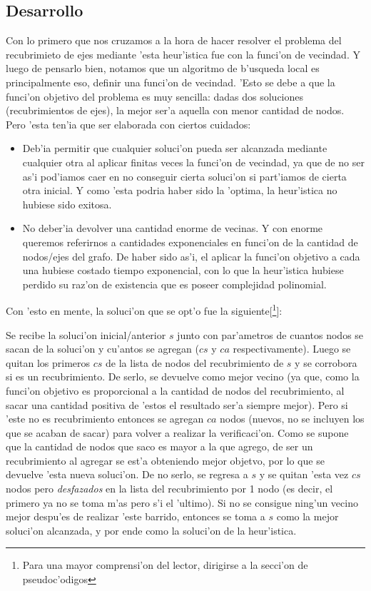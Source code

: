 \subsection{Desarrollo}
Con lo primero que nos cruzamos a la hora de hacer resolver el problema del recubrimieto de ejes mediante 'esta heur'istica fue con la funci'on de vecindad. Y luego de pensarlo bien, notamos que un algoritmo de b'usqueda local es principalmente eso, definir una funci'on de vecindad. 'Esto se debe a que la funci'on objetivo del problema es muy sencilla: dadas dos soluciones (recubrimientos de ejes), la mejor ser'a aquella con menor cantidad de nodos. Pero 'esta ten'ia que ser elaborada con ciertos cuidados:

\begin{itemize}
\item Deb'ia permitir que cualquier soluci'on pueda ser alcanzada mediante cualquier otra al aplicar finitas veces la funci'on de vecindad, ya que de no ser as'i pod'iamos caer en no conseguir cierta soluci'on si part'iamos de cierta otra inicial. Y como 'esta podria haber sido la 'optima, la heur'istica no hubiese sido exitosa.
\item No deber'ia devolver una cantidad enorme de vecinas. Y con enorme queremos referirnos a cantidades exponenciales en funci'on de la cantidad de nodos/ejes del grafo. De haber sido as'i, el aplicar la funci'on objetivo a cada una hubiese costado tiempo exponencial, con lo que la heur'istica hubiese perdido su raz'on de existencia que es poseer complejidad polinomial.
\end{itemize}

Con 'esto en mente, la soluci'on que se opt'o fue la siguiente[\footnote{Para una mayor comprensi'on del lector, dirigirse a la secci'on de pseudoc'odigos}]:

Se recibe la soluci'on inicial/anterior $s$ junto con par'ametros de cuantos nodos se sacan de la soluci'on y cu'antos se agregan ($cs$ y $ca$ respectivamente). Luego se quitan los primeros $cs$ de la lista de nodos del recubrimiento de $s$ y se corrobora si es un recubrimiento. De serlo, se devuelve como mejor vecino (ya que, como la funci'on objetivo es proporcional a la cantidad de nodos del recubrimiento, al sacar una cantidad positiva de 'estos el resultado ser'a siempre mejor). Pero si 'este no es recubrimiento entonces se agregan $ca$ nodos (nuevos, no se incluyen los que se acaban de sacar) para volver a realizar la verificaci'on. Como se supone que la cantidad de nodos que saco es mayor a la que agrego, de ser un recubrimiento al agregar se est'a obteniendo mejor objetvo, por lo que se devuelve 'esta nueva soluci'on. De no serlo, se regresa a $s$ y se quitan 'esta vez $cs$ nodos pero \emph{desfazados} en la lista del recubrimiento por 1 nodo (es decir, el primero ya no se toma m'as pero s'i el 'ultimo). Si no se consigue ning'un vecino mejor despu'es de realizar 'este barrido, entonces se toma a $s$ como la mejor soluci'on alcanzada, y por ende como la soluci'on de la heur'istica.

